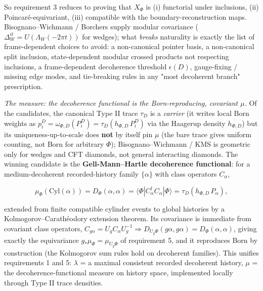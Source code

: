 \documentclass[11pt,a4paper]{article}
\begin{document}
So requirement 3 reduces to proving that $X_\Phi$ is (i) functorial under inclusions, (ii) Poincaré-equivariant, (iii) compatible with the boundary-reconstruction maps. Bisognano–Wichmann / Borchers supply modular covariance ($\Delta_W^{it} = U(\Lambda_W(-2\pi t))$ for wedges); what \emph{breaks} naturality is exactly the list of frame-dependent choices to avoid: a non-canonical pointer basis, a non-canonical split inclusion, state-dependent modular crossed products not respecting inclusions, a frame-dependent decoherence threshold $\epsilon(D)$, gauge-fixing / missing edge modes, and tie-breaking rules in any "most decoherent branch" prescription.

\emph{The measure: the decoherence functional is the Born-reproducing, covariant $\mu$.} Of the candidates, the canonical Type II trace $\tau_D$ is a \emph{carrier} (it writes local Born weights as $p_i^D = \omega_{\Phi,D}(P_i^D) = \tau_D(h_{\Phi,D}\,P_i^D)$ via the Haagerup density $h_{\Phi,D}$) but its uniqueness-up-to-scale does \textbf{not} by itself pin $\mu$ (the bare trace gives uniform counting, not Born for arbitrary $\Phi$); Bisognano–Wichmann / KMS is geometric only for wedges and CFT diamonds, not general interacting diamonds. The winning candidate is the \textbf{Gell-Mann–Hartle decoherence functional}: for a medium-decoherent recorded-history family $\{\alpha\}$ with class operators $C_\alpha$,

\[
\mu_\Phi(\mathrm{Cyl}(\alpha)) = D_\Phi(\alpha,\alpha) = \langle \Phi | C_\alpha^\dagger C_\alpha | \Phi \rangle = \tau_D(h_{\Phi,D}\,P_\alpha),
\]

extended from finite compatible cylinder events to global histories by a Kolmogorov–Carathéodory extension theorem. Its covariance is immediate from covariant class operators, $C_{g\alpha} = U_g C_\alpha U_g^{-1} \Rightarrow D_{U_g\Phi}(g\alpha,g\alpha) = D_\Phi(\alpha,\alpha)$, giving exactly the equivariance $g_*\mu_\Phi = \mu_{U_g\Phi}$ of requirement 5, and it reproduces Born by construction (the Kolmogorov sum rules hold on decoherent families). This unifies requirements 1 and 5: $\lambda$ = a maximal consistent recorded decoherent history, $\mu$ = the decoherence-functional measure on history space, implemented locally through Type II trace densities.
\end{document}
